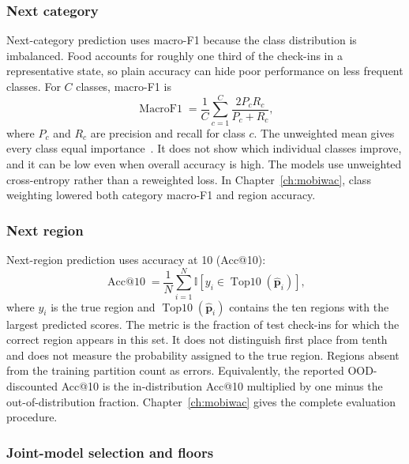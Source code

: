 \subsubsection{Next category}

Next-category prediction uses macro-F1 because the class distribution is imbalanced.
Food accounts for roughly one third of the check-ins in a representative state, so
plain accuracy can hide poor performance on less frequent classes. For $C$ classes,
macro-F1 is
\begin{equation}\label{eq:fund:macro-f1}
    \operatorname{MacroF1} = \frac{1}{C}\sum_{c=1}^{C}
    \frac{2P_cR_c}{P_c+R_c},
\end{equation}
where $P_c$ and $R_c$ are precision and recall for class $c$. The unweighted mean
gives every class equal importance~\cite{sokolova2009measures}. It does not show which
individual classes improve, and it can be low even when overall accuracy is high. The
models use unweighted cross-entropy rather than a reweighted loss. In
Chapter~\ref{ch:mobiwac}, class weighting lowered both category macro-F1 and region
accuracy.

\subsubsection{Next region}

Next-region prediction uses accuracy at 10 (Acc@10):
\begin{equation}\label{eq:fund:acc10}
    \operatorname{Acc@10} = \frac{1}{N}\sum_{i=1}^{N}
    \mathbb{I}\!\left[y_i \in \operatorname{Top10}(\hat{\mathbf{p}}_i)\right],
\end{equation}
where $y_i$ is the true region and $\operatorname{Top10}(\hat{\mathbf{p}}_i)$ contains
the ten regions with the largest predicted scores. The metric is the fraction of test
check-ins for which the correct region appears in this set. It does not distinguish
first place from tenth and does not measure the probability assigned to the true
region. Regions absent from the training partition count as errors. Equivalently, the
reported OOD-discounted Acc@10 is the in-distribution Acc@10 multiplied by one minus
the out-of-distribution fraction. Chapter~\ref{ch:mobiwac} gives the complete
evaluation procedure.

\subsubsection{Joint-model selection and floors}

